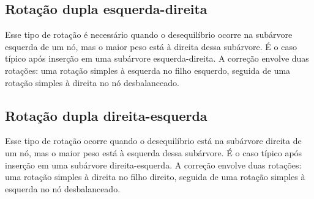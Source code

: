 \subsection*{Rotação dupla esquerda-direita}

Esse tipo de rotação é necessário quando o desequilíbrio ocorre na subárvore esquerda de um nó, mas o maior peso está à direita dessa subárvore. É o caso típico após inserção em uma subárvore esquerda-direita. A correção envolve duas rotações: uma rotação simples à esquerda no filho esquerdo, seguida de uma rotação simples à direita no nó desbalanceado.

\begin{center}
\end{center}


\subsection*{Rotação dupla direita-esquerda}

Esse tipo de rotação ocorre quando o desequilíbrio está na subárvore direita de um nó, mas o maior peso está à esquerda dessa subárvore. É o caso típico após inserção em uma subárvore direita-esquerda. A correção envolve duas rotações: uma rotação simples à direita no filho direito, seguida de uma rotação simples à esquerda no nó desbalanceado.

\begin{center}
\end{center}

